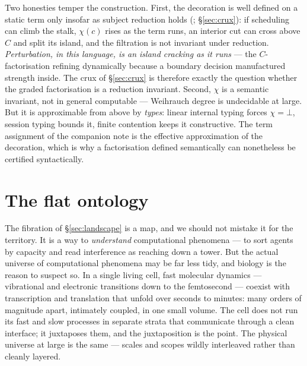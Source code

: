 \documentclass[11pt]{article}
\theoremstyle{definition}
\theoremstyle{plain}
\theoremstyle{remark}
\begin{document}
\noindent
Two honesties temper the construction. First, the decoration is well defined on a static term only
insofar as subject reduction holds (\cite{choicesched}; \S\ref{sec:crux}): if scheduling can climb
the stalk, $\chi(c)$ rises as the term runs, an interior cut can cross above $C$ and split its
island, and the filtration is not invariant under reduction. \emph{Perturbation, in this language,
is an island cracking as it runs} --- the $C$-factorisation refining dynamically because a boundary
decision manufactured strength inside. The crux of \S\ref{sec:crux} is therefore exactly the
question whether the graded factorisation is a reduction invariant. Second, $\chi$ is a semantic
invariant, not in general computable --- Weihrauch degree is undecidable at large. But it is
approximable from above by \emph{types}: linear internal typing forces $\chi = \bot$, session typing
bounds it, finite contention keeps it constructive. The term assignment of the companion note is the
effective approximation of the decoration, which is why a factorisation defined semantically can
nonetheless be certified syntactically.

\section{The flat ontology}\label{sec:flat}

The fibration of \S\ref{sec:landscape} is a map, and we should not mistake it for the
territory. It is a way to \emph{understand} computational phenomena --- to sort agents
by capacity and read interference as reaching down a tower. But the actual universe of
computational phenomena may be far less tidy, and biology is the reason to suspect so.
In a single living cell, fast molecular dynamics --- vibrational and electronic
transitions down to the femtosecond --- coexist with transcription and translation
that unfold over seconds to minutes: many orders of magnitude apart, intimately
coupled, in one small volume. The cell does not run its fast and slow processes in
separate strata that communicate through a clean interface; it juxtaposes them, and the
juxtaposition is the point. The physical universe at large is the same --- scales and
scopes wildly interleaved rather than cleanly layered.
\end{document}
